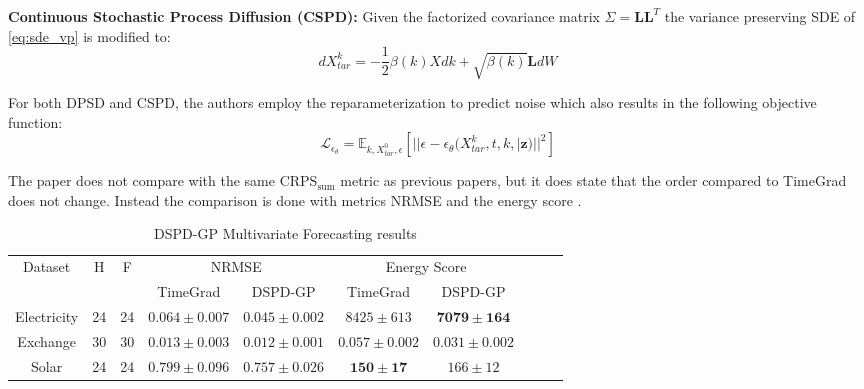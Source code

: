 \textbf{Continuous Stochastic Process Diffusion (CSPD):}
Given the factorized covariance matrix $\Sigma = \mathbf{L}\mathbf{L}^T$ the variance preserving SDE of \autoref{eq:sde_vp} is modified to:
\begin{equation}
    dX_{tar}^k = -\frac{1}{2}\beta(k) X dk + \sqrt{\beta(k)}\mathbf{L}dW
\end{equation}

For both DPSD and CSPD, the authors employ the reparameterization to predict noise which also results in the following objective function:
\begin{equation}
    \mathcal{L}_{\epsilon_\theta} = \mathbb{E}_{k, X_{tar}^0, \epsilon} \left[|| \epsilon - \epsilon_\theta(X_{tar}^k,  t, k, | \mathbf{z})||^2 \right]
\end{equation}

The paper does not compare with the same CRPS$_{\text{sum}}$ metric as previous papers, but it does state that the order compared to TimeGrad does not change. Instead the comparison is done with metrics NRMSE and the energy score \cite{gneiting_strictly_2007}.

\begin{table}[ht]
    \centering
    \begin{tabular}{cccccccccc}
        \toprule
        \multirow{2}{*}{Dataset} & \multirow{2}{*}{H} & \multirow{2}{*}{F} & \multicolumn{2}{c}{NRMSE} & \multicolumn{2}{c}{Energy Score} \\
        \cmidrule(lr){4-5} \cmidrule(lr){6-7}
         & & & TimeGrad & DSPD-GP & TimeGrad & DSPD-GP \\
        \midrule
        Electricity & 24  & 24  & $0.064 \pm 0.007$ & $\mathbf{0.045 \pm 0.002}$ & $8425 \pm 613$ & $\mathbf{7079 \pm 164}$ \\
        \midrule
        Exchange & 30  & 30  & $0.013 \pm 0.003$ & $\mathbf{0.012 \pm 0.001}$ & $0.057 \pm 0.002$ & $\mathbf{0.031 \pm 0.002}$ \\
        \midrule
        Solar & 24  & 24  & $0.799 \pm 0.096$ & $\mathbf{0.757 \pm 0.026}$ & $\mathbf{150 \pm 17}$ & $166 \pm 12$ \\
        \bottomrule
    \end{tabular}
    \caption{DSPD-GP Multivariate Forecasting results \cite{bilos_modeling_2022}}
    \label{tab:dspd-gp-results}
\end{table}

